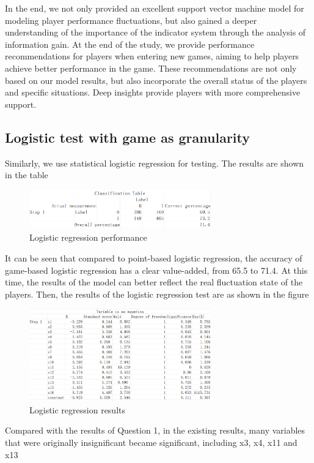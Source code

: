 \documentclass{article}
\begin{document}
In the end, we not only provided an excellent support vector machine model for modeling player performance fluctuations, but also gained a deeper understanding of the importance of the indicator system through the analysis of information gain. At the end of the study,
we provide performance recommendations for players when entering new games, aiming to help players achieve better performance in the game. These recommendations are not only based on our model results, but also incorporate the overall status of the players and specific 
situations. Deep insights provide players with more comprehensive support.

\subsection{Logistic test with game as granularity}
Similarly, we use statistical logistic regression for testing. The results are shown in the table
\begin{figure}[H]
      \centering
      \includegraphics[width=0.7\textwidth]{logisitc_classification2.png}
      \caption{Logistic regression performance}
\end{figure}
It can be seen that compared to point-based logistic regression, the accuracy of game-based logistic regression has a clear value-added, 
from 65.5 to 71.4. At this time, the results of the model can better reflect the real fluctuation state of the players. Then, the results of the logistic 
regression test are as shown in the figure
\begin{figure}[H]
      \centering
      \includegraphics[width=0.7\textwidth]{logistic_eq2.png}
      \caption{Logistic regression results}
\end{figure}
Compared with the results of Question 1, in the existing results, many variables that were originally insignificant became significant, including x3, x4, x11 and x13


\end{document}
